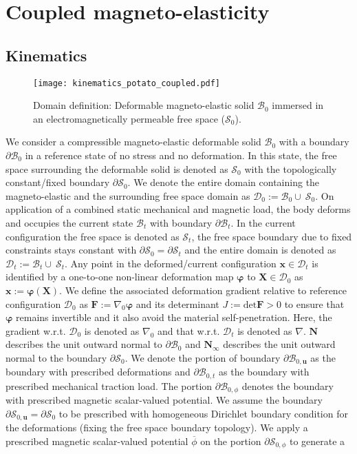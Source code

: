 \chapter{Coupled magneto-elasticity}

\section{Kinematics}

\begin{figure}[h]
\centering
\texttt{[image: kinematics\_potato\_coupled.pdf]}
\caption{Domain definition: Deformable magneto-elastic solid $\mathcal{B}_0$ immersed in an electromagnetically permeable free space ($\mathcal{S}_0$).}
\label{fig:3.2}
\end{figure}

We consider a compressible magneto-elastic deformable solid $\mathcal{B}_0$ with a boundary $\partial \mathcal{B}_0$ in a reference state of no stress and no deformation. In this state, the free space surrounding the deformable solid is denoted as $\mathcal{S}_0$ with the topologically constant/fixed boundary $\partial \mathcal{S}_0$. We denote the entire domain containing the magneto-elastic and the surrounding free space domain as $\mathcal{D}_0 := \mathcal{B}_0 \cup \ \mathcal{S}_0$. On application of a combined static mechanical and magnetic load, the body deforms and occupies the current state $\mathcal{B}_t$ with boundary $\partial \mathcal{B}_t$. In the current configuration the free space is denoted as $\mathcal{S}_t$, the free space boundary due to fixed constraints stays constant with $\partial \mathcal{S}_0 = \partial \mathcal{S}_t$ and the entire domain is denoted as $\mathcal{D}_t := \mathcal{B}_t \cup \ \mathcal{S}_t$. Any point in the deformed/current configuration $\mathbf{x} \in \mathcal{D}_t$ is identified by a one-to-one non-linear deformation map $\bm{\varphi}$ to $\mathbf{X} \in \mathcal{D}_0$ as $\mathbf{x} := \bm{\varphi} (\mathbf{X})$. We define the associated deformation gradient relative to reference configuration $\mathcal{D}_0$ as $\mathbf{F} := \nabla_0 \bm{\varphi}$ and its determinant $J := \text{det} \mathbf{F} > 0$ to ensure that $\bm{\varphi}$ remains invertible and it also avoid the material self-penetration. Here, the gradient w.r.t. $\mathcal{D}_0$ is denoted as $\nabla_0$ and that w.r.t. $\mathcal{D}_t$ is denoted as $\nabla$. $\mathbf{N}$ describes the unit outward normal to $\partial \mathcal{B}_0$ and $\mathbf{N}_{\infty}$ describes the unit outward normal to the boundary $\partial \mathcal{S}_0$. We denote the portion of boundary $\partial \mathcal{B}_{0, \mathbf{u}}$ as the boundary with prescribed deformations and $\partial \mathcal{B}_{0, t}$ as the boundary with prescribed mechanical traction load. The portion $\partial \mathcal{B}_{0, \phi}$ denotes the boundary with prescribed magnetic scalar-valued potential. We assume the boundary $\partial \mathcal{S}_{0,\mathbf{u}} = \partial \mathcal{S}_{0}$ to be prescribed with homogeneous Dirichlet boundary condition for the deformations (fixing the free space boundary topology). We apply a prescribed magnetic scalar-valued potential $\overline{\phi}$ on the portion $\partial \mathcal{S}_{0, \phi}$ to generate a 